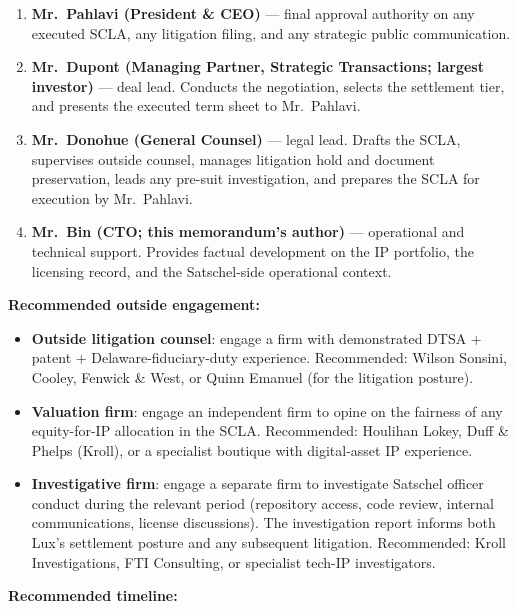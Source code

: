\documentclass[11pt,letterpaper]{article}
\begin{document}
\begin{enumerate}[leftmargin=1.5em,itemsep=0.1em]
\item \textbf{Mr.\ Pahlavi (President \& CEO)} --- final approval
authority on any executed SCLA, any litigation filing, and any
strategic public communication.
\item \textbf{Mr.\ Dupont (Managing Partner, Strategic Transactions;
largest investor)} --- deal lead. Conducts the negotiation, selects
the settlement tier, and presents the executed term sheet to Mr.\
Pahlavi.
\item \textbf{Mr.\ Donohue (General Counsel)} --- legal lead.
Drafts the SCLA, supervises outside counsel, manages litigation
hold and document preservation, leads any pre-suit investigation,
and prepares the SCLA for execution by Mr.\ Pahlavi.
\item \textbf{Mr.\ Bin (CTO; this memorandum's author)} ---
operational and technical support. Provides factual development on
the IP portfolio, the licensing record, and the Satschel-side
operational context.
\end{enumerate}

\textbf{Recommended outside engagement:}

\begin{itemize}[leftmargin=1.5em,itemsep=0.1em]
\item \textbf{Outside litigation counsel}: engage a firm with
demonstrated DTSA + patent + Delaware-fiduciary-duty experience.
Recommended: Wilson Sonsini, Cooley, Fenwick \& West, or Quinn
Emanuel (for the litigation posture).
\item \textbf{Valuation firm}: engage an independent firm to opine
on the fairness of any equity-for-IP allocation in the SCLA.
Recommended: Houlihan Lokey, Duff \& Phelps (Kroll), or a specialist
boutique with digital-asset IP experience.
\item \textbf{Investigative firm}: engage a separate firm to
investigate Satschel officer conduct during the relevant period
(repository access, code review, internal communications, license
discussions). The investigation report informs both Lux's settlement
posture and any subsequent litigation. Recommended: Kroll
Investigations, FTI Consulting, or specialist tech-IP investigators.
\end{itemize}

\textbf{Recommended timeline:}
\end{document}
